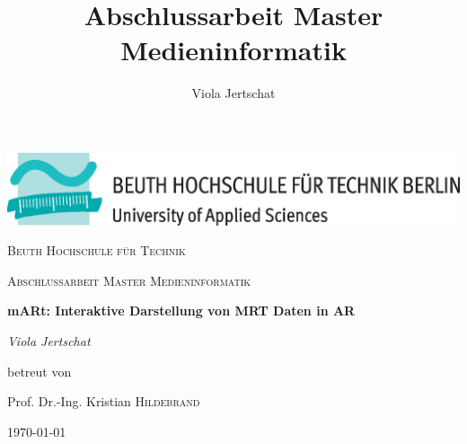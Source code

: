 \documentclass[a4paper,11pt]{report}
\title{Abschlussarbeit Master Medieninformatik}
\author{Viola Jertschat}
\begin{document}
\begin{titlepage}
	\centering
	\includegraphics[width=\textwidth]{images/beuthlogo.eps}\par\vspace{1cm}
	{\scshape\LARGE Beuth Hochschule für Technik \par}
	\vspace{1cm}
	{\scshape\Large Abschlussarbeit Master Medieninformatik\par}
	\vspace{1.5cm}
	{\huge\bfseries mARt: Interaktive Darstellung von MRT Daten in AR\par}
	\vspace{2cm}
	{\Large\itshape Viola Jertschat\par}
	\vfill
	betreut von\par
	Prof. Dr.-Ing. Kristian \textsc{Hildebrand}

	\vfill

	{\large \today\par}
\end{titlepage}

\tableofcontents

\listoffigures

\printglossaries

%


\pagebreak

\printbibliography
\end{document}

